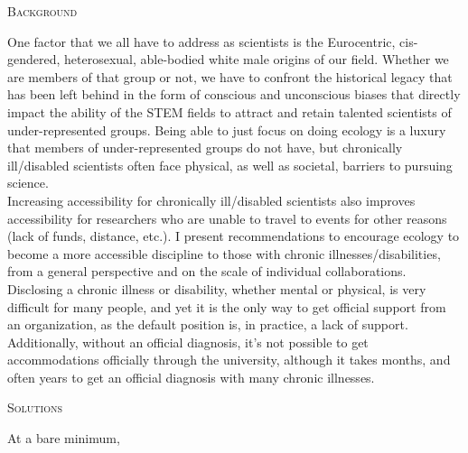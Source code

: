 \documentclass{beamer}
\begin{document}
\begin{minipage}{0.45\linewidth}
\begin{Large}
\begin{center}
\textsc{Background}
\end{center}
\end{Large}
One factor that we all have to address as scientists is the Eurocentric, cis-gendered, heterosexual, able-bodied white male origins of our field.  Whether we are members of that group or not, we have to confront the historical legacy that has been left behind in the form of conscious and unconscious biases that directly impact the ability of the STEM fields to attract and retain talented scientists of under-represented groups.  Being able to just focus on doing ecology is a luxury that members of under-represented groups do not have, but chronically ill/disabled scientists often face physical, as well as societal, barriers to pursuing science.\\ 


Increasing accessibility for chronically ill/disabled scientists also improves accessibility for researchers who are unable to travel to events for other reasons (lack of funds, distance, etc.). I present recommendations to encourage ecology to become a more accessible discipline to those with chronic illnesses/disabilities, from a general perspective and on the scale of individual collaborations.\\ 

Disclosing a chronic illness or disability, whether mental or physical, is very difficult for many people, and yet it is the only way to get official support from an organization, as the default position is, in practice, a lack of support.  Additionally, without an official diagnosis, it's not possible to get accommodations officially through the university, although it takes months, and often years to get an official diagnosis with many chronic illnesses.  
\end{minipage}
\begin{minipage}{0.45\linewidth}
\begin{Large}
\begin{center}
\textsc{Solutions}
\end{center}
\end{Large}
At a bare minimum, 
\end{minipage}
\end{document}
